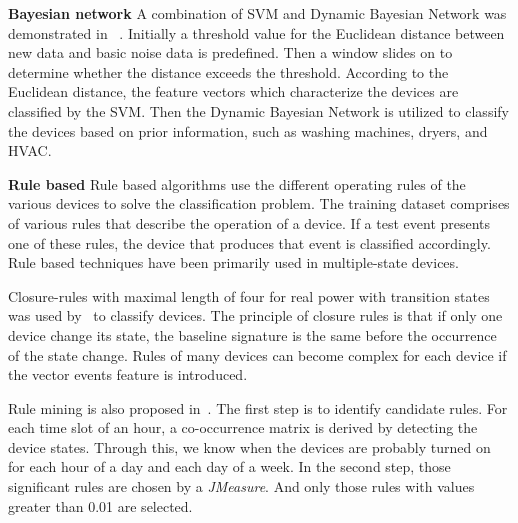 %



\textbf{Bayesian network}
A combination of SVM and Dynamic Bayesian Network was demonstrated in ~\cite{froehlich2011disaggregated}.
Initially a threshold value for the Euclidean distance between new data and
basic noise data is predefined. 
Then a window slides on to determine whether the distance
exceeds the threshold. According to the Euclidean distance,
the feature vectors which characterize the devices are classified by the SVM.
Then the Dynamic Bayesian Network is utilized to classify the devices based on
prior information, such as washing machines, dryers, and
HVAC.


\textbf{Rule based}
Rule based algorithms use the different operating rules of the various devices to solve the classification problem. 
The training dataset comprises of various rules that describe the operation of a device. If a test event presents one of these rules, the device that produces that event is classified accordingly. Rule based techniques have been primarily used in multiple-state devices. 

Closure-rules with maximal length of four for real power with transition states was used by~\cite{hampden2012closure} to classify devices.
The principle of closure rules is that
if only one device change its state,
the baseline signature is the same before the occurrence of the state
change.
Rules of many devices can become complex for each device 
if the vector events feature is introduced. 

Rule mining is also proposed in~\cite{rollins2014using}. 
The first step is to identify candidate rules. 
For each time slot of an hour, 
a co-occurrence matrix is derived by detecting the device states. 
Through this, we know when the devices are probably turned on for each 
hour of a day and each day of a week. 
In the second step, those significant rules are chosen by a \textit{JMeasure}. 
And only those rules with values greater than 0.01 are selected. 



